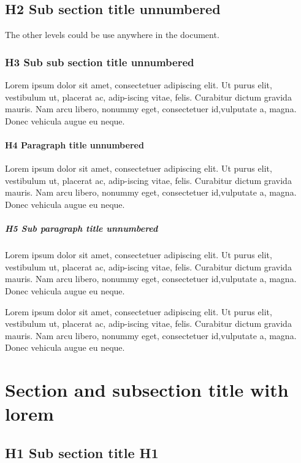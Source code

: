 \documentclass[Theme1]{{template_material/eurostat}}
\begin{document}
\subsection*{H2 Sub section title unnumbered }

The other levels could be use anywhere in the document.

\subsubsection*{H3 Sub sub section title unnumbered}

Lorem ipsum dolor sit amet, consectetuer adipiscing elit. Ut purus elit, vestibulum ut, placerat ac, adip-iscing vitae, felis. Curabitur dictum gravida mauris. Nam arcu libero, nonummy eget, consectetuer id,vulputate a, magna. Donec vehicula augue eu neque.

\paragraph*{H4 Paragraph title unnumbered}
Lorem ipsum dolor sit amet, consectetuer adipiscing elit. Ut purus elit, vestibulum ut, placerat ac, adip-iscing vitae, felis. Curabitur dictum gravida mauris. Nam arcu libero, nonummy eget, consectetuer id,vulputate a, magna. Donec vehicula augue eu neque.

\subparagraph*{H5 Sub paragraph title unnumbered}
Lorem ipsum dolor sit amet, consectetuer adipiscing elit. Ut purus elit, vestibulum ut, placerat ac, adip-iscing vitae, felis. Curabitur dictum gravida mauris. Nam arcu libero, nonummy eget, consectetuer id,vulputate a, magna. Donec vehicula augue eu neque.

Lorem ipsum dolor sit amet, consectetuer adipiscing elit. Ut purus elit, vestibulum ut, placerat ac, adip-iscing vitae, felis. Curabitur dictum gravida mauris. Nam arcu libero, nonummy eget, consectetuer id,vulputate a, magna. Donec vehicula augue eu neque.

\newpage %

\section{Section and subsection title with lorem}



\subsection{H1 Sub section title H1}
\lipsum[1-1]
\end{document}

